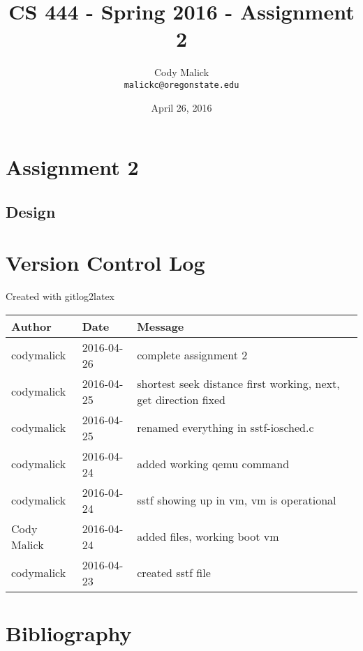 \documentclass[10pt,letterpaper]{article}
\begin{document}
\begin{titlepage}
  \title{CS 444 - Spring 2016 - Assignment 2}
  \author{Cody Malick\\
  \texttt{malickc@oregonstate.edu}}
  \date{April 26, 2016}
  \maketitle
  \vspace*{2cm}
  \begin{abstract}
      \noindent   \end{abstract}

\end{titlepage}

\tableofcontents
\clearpage

\section{Assignment 2}
  \subsection{Design}

\section{Version Control Log}
Created with gitlog2latex
\begin{center}
\begin{longtabu} to \textwidth {|
    X[4,l]|
    X[3,c]|
    X[8,l]|}
    \hline
    \textbf{Author} & \textbf{Date} & \textbf{Message} \\ \hline
codymalick & 2016-04-26 & complete assignment 2 \\ \hline
codymalick & 2016-04-25 & shortest seek distance first working, next, get direction fixed \\ \hline
codymalick & 2016-04-25 & renamed everything in sstf-iosched.c \\ \hline
codymalick & 2016-04-24 & added working qemu command \\ \hline
codymalick & 2016-04-24 & sstf showing up in vm, vm is operational \\ \hline
Cody Malick & 2016-04-24 & added files, working boot vm \\ \hline
codymalick & 2016-04-23 & created sstf file \\ \hline

\end{longtabu}
\end{center}

\clearpage
\section{Bibliography}



\end{document}
